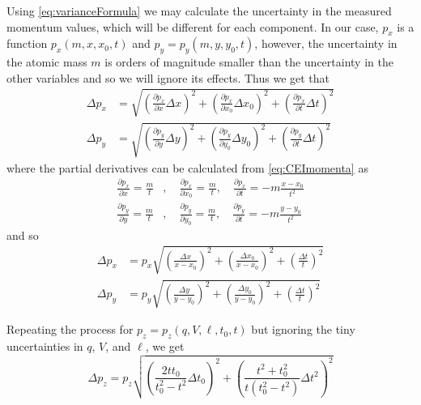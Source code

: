 Using \eqref{eq:varianceFormula} we may calculate the uncertainty in the measured momentum values, which will be different for each component. In our case, $p_x$ is a function $p_x(m,x,x_0,t)$ and $p_y = p_y(m,y,y_0,t)$, however, the uncertainty in the atomic mass $m$ is orders of magnitude smaller than the uncertainty in the other variables and so we will ignore its effects. Thus we get that
\begin{subequations}
  \begin{align}
  \Delta p_x &= \sqrt{
    \left( \frac{\partial p_x}{\partial x}\Delta x \right)^2
    + \left( \frac{\partial p_x}{\partial x_0}\Delta x_0 \right)^2
    + \left(\frac{\partial p_x}{\partial t}\Delta t \right)^2
   } \\
  \Delta p_y &= \sqrt{
    \left( \frac{\partial p_y}{\partial y}\Delta y \right)^2
    + \left(\frac{\partial p_y}{\partial y_0}\Delta y_0 \right)^2
    + \left(\frac{\partial p_y}{\partial t}\Delta t \right)^2
  }
  \end{align}
\end{subequations}
where the partial derivatives can be calculated from \eqref{eq:CEImomenta} as
\begin{subequations}
  \begin{align}
  \frac{\partial p_x}{\partial x} = \frac{m}{t} &,\quad \frac{\partial p_x}{\partial x_0} = \frac{m}{t} ,\quad \frac{\partial p_x}{\partial t} = -m\frac{x-x_0}{t^2}\\
  \frac{\partial p_y}{\partial y} = \frac{m}{t} &,\quad \frac{\partial p_y}{\partial y_0} = \frac{m}{t} ,\quad \frac{\partial p_y}{\partial t} = -m\frac{y-y_0}{t^2}
  \end{align}
\end{subequations}
and so
\begin{subequations}
  \begin{align}
  \Delta p_x &= p_x \sqrt{
    \left( \frac{\Delta x}{x - x_0} \right)^2
    + \left( \frac{\Delta x_0}{x - x_0} \right)^2
    + \left( \frac{\Delta t}{t} \right)^2 } \\
  \Delta p_y &= p_y \sqrt{
    \left( \frac{\Delta y}{y - y_0} \right)^2
    + \left( \frac{\Delta y_0}{y - y_0} \right)^2
    + \left( \frac{\Delta t}{t} \right)^2 }
  \end{align}
\end{subequations}

Repeating the process for $p_z = p_z(q,V,\ell,t_0,t)$ but ignoring the tiny uncertainties in $q$, $V$, and $\ell$, we get
\begin{equation}
\Delta p_z = p_z \sqrt{
  \left( \frac{2tt_0}{t_0^2 - t^2} \Delta t_0 \right)^2
  + \left( \frac{t^2 + t_0^2}{t(t_0^2 - t^2)} \Delta t^2 \right)^2
}
\end{equation}

